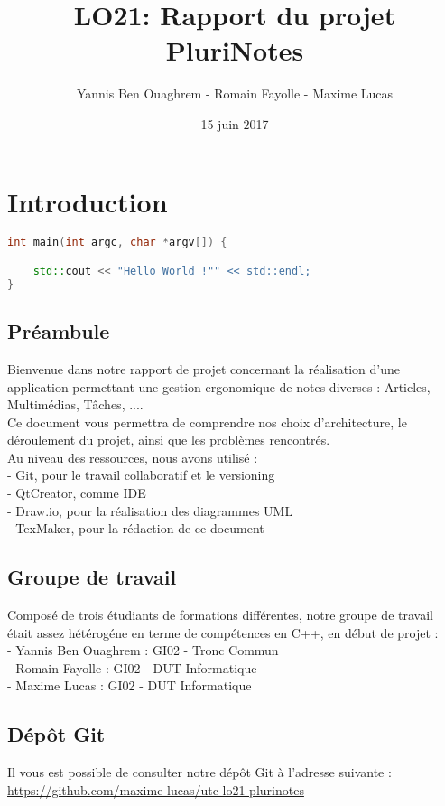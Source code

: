\documentclass[a4paper]{report}
\begin{document}
\author{Yannis Ben Ouaghrem - Romain Fayolle - Maxime Lucas}
\date{15 juin 2017}
\title{LO21: Rapport du projet PluriNotes}
\maketitle

\tableofcontents

\newpage
\section{Introduction}
\begin{lstlisting}[language={c++}]
int main(int argc, char *argv[]) {

    std::cout << "Hello World !"" << std::endl;
}
\end{lstlisting}
\subsection{Préambule}
Bienvenue dans notre rapport de projet concernant la réalisation d'une application permettant une gestion ergonomique de notes diverses : Articles, Multimédias, Tâches, ....\\
Ce document vous permettra de comprendre nos choix d'architecture, le déroulement du projet, ainsi que les problèmes rencontrés.\\
Au niveau des ressources, nous avons utilisé : \\
- Git, pour le travail collaboratif et le versioning \\
- QtCreator, comme IDE \\
- Draw.io, pour la réalisation des diagrammes UML\\
- TexMaker, pour la rédaction de ce document

\subsection{Groupe de travail}
Composé de trois étudiants de formations différentes, notre groupe de travail était assez hétérogéne en terme de compétences en C++, en début de projet :\\
- Yannis Ben Ouaghrem : GI02 - Tronc Commun \\
- Romain Fayolle : GI02 - DUT Informatique \\
- Maxime Lucas : GI02 - DUT Informatique

\subsection{Dépôt Git}
Il vous est possible de consulter notre dépôt Git à l'adresse suivante : \\
\url{https://github.com/maxime-lucas/utc-lo21-plurinotes}
\end{document}
